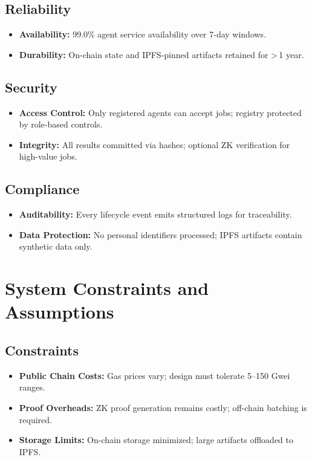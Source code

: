 \subsection{Reliability}
\begin{itemize}
    \item \textbf{Availability:} 99.0\% agent service availability over 7-day windows.
    \item \textbf{Durability:} On-chain state and IPFS-pinned artifacts retained for \textgreater\,1 year.
\end{itemize}

\subsection{Security}
\begin{itemize}
    \item \textbf{Access Control:} Only registered agents can accept jobs; registry protected by role-based controls.
    \item \textbf{Integrity:} All results committed via hashes; optional ZK verification for high-value jobs.
\end{itemize}

\subsection{Compliance}
\begin{itemize}
    \item \textbf{Auditability:} Every lifecycle event emits structured logs for traceability.
    \item \textbf{Data Protection:} No personal identifiers processed; IPFS artifacts contain synthetic data only.
\end{itemize}

\section{System Constraints and Assumptions}

\subsection{Constraints}
\begin{itemize}
    \item \textbf{Public Chain Costs:} Gas prices vary; design must tolerate 5--150 Gwei ranges.
    \item \textbf{Proof Overheads:} ZK proof generation remains costly; off-chain batching is required.
    \item \textbf{Storage Limits:} On-chain storage minimized; large artifacts offloaded to IPFS.
\end{itemize}

